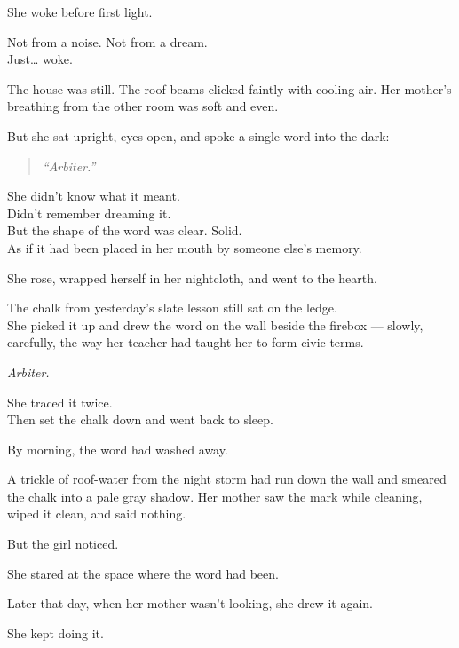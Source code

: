 \documentclass[12pt]{article}
\begin{document}
She woke before first light.

Not from a noise. Not from a dream.\\
Just… woke.

The house was still. The roof beams clicked faintly with cooling air. Her mother’s breathing from the other room was soft and even.

But she sat upright, eyes open, and spoke a single word into the dark:

\begin{quote}
\textit{“Arbiter.”}
\end{quote}

She didn’t know what it meant.\\
Didn’t remember dreaming it.\\
But the shape of the word was clear. Solid.\\
As if it had been placed in her mouth by someone else’s memory.

\vspace{1em}

She rose, wrapped herself in her nightcloth, and went to the hearth.

The chalk from yesterday’s slate lesson still sat on the ledge.\\
She picked it up and drew the word on the wall beside the firebox --- slowly, carefully, the way her teacher had taught her to form civic terms.

\begin{center}
\textit{Arbiter.}
\end{center}

She traced it twice.\\
Then set the chalk down and went back to sleep.

\vspace{1em}

By morning, the word had washed away.

A trickle of roof-water from the night storm had run down the wall and smeared the chalk into a pale gray shadow. Her mother saw the mark while cleaning, wiped it clean, and said nothing.

But the girl noticed.

She stared at the space where the word had been.

Later that day, when her mother wasn’t looking, she drew it again.

\vspace{1em}

She kept doing it.
\end{document}
